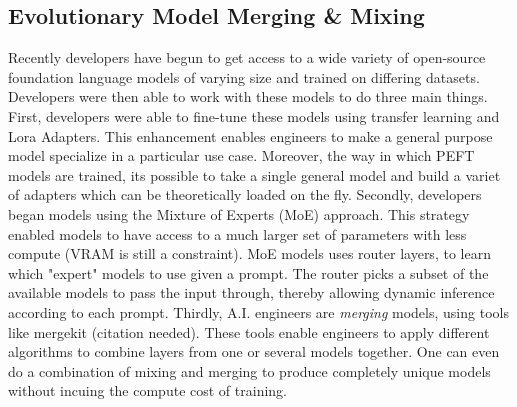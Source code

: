 \subsection{Evolutionary Model Merging & Mixing}

Recently developers have begun to get access to a wide variety of open-source foundation language models of varying size and trained on differing datasets. Developers were then able to work with these models to do three main things. First, developers were able to fine-tune these models using transfer learning and Lora Adapters. This enhancement enables engineers to make a general purpose model specialize in a particular use case. Moreover, the way in which PEFT models are trained, its possible to take a single general model and build a variet of adapters which can be theoretically loaded on the fly. Secondly, developers began  models using the Mixture of Experts (MoE) approach. This strategy enabled models to have access to a much larger set of parameters with less compute (VRAM is still a constraint). MoE models uses router layers, to learn which "expert" models to use given a prompt. The router picks a subset of the available models to pass the input through, thereby allowing dynamic inference according to each prompt. Thirdly, A.I. engineers are \textit{merging} models, using tools like mergekit (citation needed). These tools enable engineers to apply different algorithms to combine layers from one or several models together. One can even do a combination of mixing and merging to produce completely unique models without incuing the compute cost of training.
